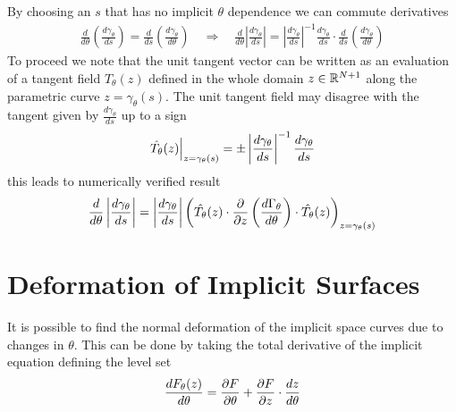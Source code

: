 By choosing an $s$ that has no implicit $\theta$ dependence we can commute derivatives
\begin{align}
    \frac{d}{d\theta}\left(\frac{d\gamma_{\theta}}{ds}\right)
    = \frac{d}{ds}\left(\frac{d\gamma_{\theta}}{d\theta}\right)
    \quad\Rightarrow\quad
    \frac{d}{d\theta}\left|\frac{d\gamma_{\theta}}{ds}\right|=
    \left|\frac{d\gamma_{\theta}}{ds}\right|^{-1}
    \frac{d\gamma_{\theta}}{ds}\cdot\frac{d}{d s}
    \left(\frac{d\gamma_{\theta}}{d\theta}\right)
\end{align}
To proceed we note that the unit tangent vector can be written as an evaluation of a tangent field $\hat{T}_{\theta}(z)$ defined in the whole domain $z\in\mathbb{R}^{N+1}$ along the parametric curve $z=\gamma_{\theta}(s)$. The unit tangent field may disagree with the tangent given by $\frac{d\gamma_{\theta}}{ds}$ up to a sign
\begin{align}
    \left.\hat{T_{\theta}}(z)\right|_{z=\gamma_{\theta}(s)}=
    \pm\left|\frac{d\gamma_{\theta}}{ds}\right|^{-1}\frac{d\gamma_{\theta}}{d s}
\end{align}
this leads to numerically verified result%
\begin{align}
    \frac{d}{d\theta}\left|\frac{d\gamma_{\theta}}{ds}\right|=
    \left|\frac{d\gamma_{\theta}}{ds}\right|\left(
   \hat{T_{\theta}}(z)\cdot\frac{\partial }{\partial z}\left(\frac{d\Gamma_{\theta}}{d \theta}\right)\cdot
   \hat{T_{\theta}}(z)
    \right)_{z=\gamma_\theta(s)}
    \label{eq:divergence-term}
\end{align}

\section{Deformation of Implicit Surfaces}
\label{appendix:deformation}
It is possible to find the normal deformation of the implicit space curves due to changes in $\theta$. This can be done by taking the total derivative of the implicit equation defining the level set
\begin{align}
    \frac{dF_{\theta}(z)}{d\theta}=\frac{\partial F}{\partial\theta}+
    \frac{\partial F}{\partial z}\cdot\frac{d z}{d \theta}
\end{align}

